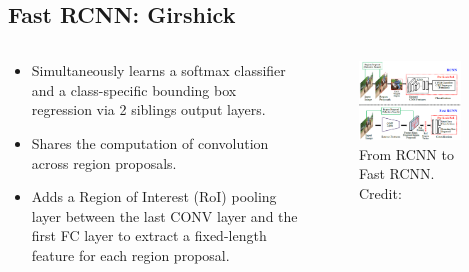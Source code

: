 \documentclass{beamer}
\begin{document}
\subsection{Fast RCNN: Girshick \cite{girshick_fast_2015}}
\begin{frame}{}
	\begin{columns}
		\begin{column}{0.5\textwidth}
			\begin{itemize}
				\item Simultaneously learns a softmax classifier and a class-specific bounding box regression via 2 siblings output layers.
				\item Shares the computation of convolution across region proposals.
				\item Adds a Region of Interest (RoI) pooling layer between the last CONV layer and the first FC layer to extract a fixed-length feature for each region proposal. 
			\end{itemize}
		\end{column}
		\begin{column}{0.5\textwidth}
			\begin{figure}
				\centering
				\includegraphics[width=0.9\textwidth]{images/rcnn-fastrcnn.PNG}
				\caption{From RCNN to Fast RCNN.
					\hbox{\scriptsize Credit:}}
			\end{figure}
		\end{column}
	\end{columns}
\end{frame}
\end{document}
